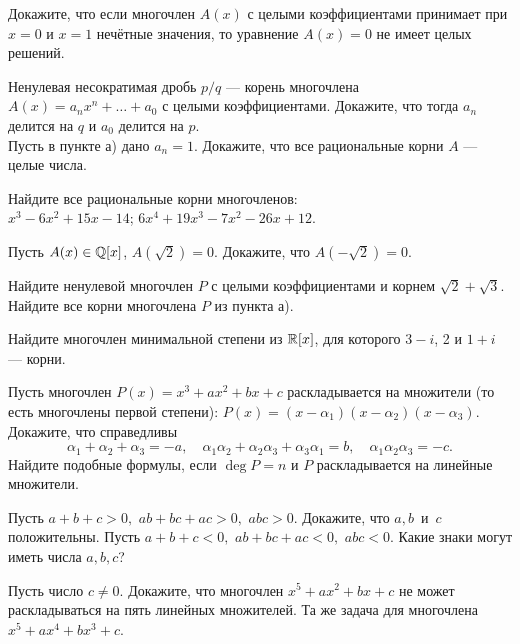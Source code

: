 \documentclass[a4paper,12pt]{article}
\begin{document}





  Докажите, что  если многочлен $A(x)$ с целыми коэффициентами
принимает при $x=0$ и $x=1$ неч\"етные значения, то уравнение $A(x)=0$
не имеет целых решений.

  Ненулевая несократимая дробь $p/q$ --- корень многочлена
$A(x)=a_nx^n + \dots + a_0$ с целыми коэффициентами.
Докажите, что  тогда $a_n$ делится на $q$
и $a_0$ делится на $p$.\\
 Пусть в пункте а) дано $a_n=1$. Докажите, что
все рациональные корни $A$ --- целые числа.

 Найдите все рациональные корни многочленов:\\
 $x^3-6x^2+15x-14$;
 $6x^4+19x^3-7x^2-26x+12$.

Пусть $A(x)\in\mathbb{Q}[x]$, $A(\sqrt2)=0$. Докажите, что $A(-\sqrt2)=0.$

Найдите ненулевой
многочлен $P$ с целыми коэффициентами и корнем
$\sqrt2+\sqrt3$.
 Найдите все корни многочлена $P$ из пункта а).


Найдите многочлен минимальной степени из $\mathbb{R}[x]$, для которого $3-i$, 2 и $1+i$ --- корни.






 Пусть многочлен $P(x)=x^3+ax^2+bx+c$
раскладывается на  множители (то есть многочлены
первой степени):
$P(x)=(x-\alpha_1)(x-\alpha_2)(x-\alpha_3)$.
Докажите, что справедливы 
$$\alpha_1+\alpha_2+\alpha_3=-a, \quad
\alpha_1\alpha_2+\alpha_2\alpha_3+\alpha_3\alpha_1=b,\quad
\alpha_1\alpha_2\alpha_3=-c.$$
 Найдите подобные формулы, если $\deg P=n$ и
$P$ раскладывается на линейные множители.


 Пусть $a+b+c>0,$ $ab+bc+ac>0,$ $abc>0.$
Докажите, что $a,b$~и~$c$ положительны.
 Пусть  $a+b+c<0,$ $ab+bc+ac<0,$ $abc<0.$
Какие знаки могут иметь числа $a,b,c$?

 Пусть число $c \ne 0.$  Докажите, что  многочлен $x^5+ax^2+bx+c$
не может раскладываться на пять линейных множителей.
 Та же задача для многочлена $x^5+ax^4+bx^3+c$.
\end{document}
